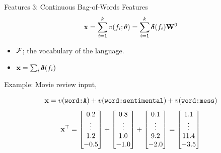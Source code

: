 \documentclass{beamer}
\begin{document}
\begin{frame}{Features 3: Continuous Bag-of-Words Features}
  \[ \mathbf{x} = \sum_{i=1}^{k} v(f_i; \theta) = \sum_{i=1}^{k} \boldsymbol{\delta}(f_i) \mathbf{W}^0\]

  \begin{itemize}
  \item $\mathcal{F}$; the vocabulary of the language.
  \item $\mathbf{x} = \sum_{i} \boldsymbol{\delta}(f_i)$ 
  \end{itemize}

  Example: Movie review input, 
  \begin{center}
    \[\mathbf{x} = v(\texttt{word:A}) + v(\texttt{word:sentimental}) + v(\texttt{word:mess})\]
    \[ \mathbf{x}^\top = \begin{bmatrix} 0.2 \\ \vdots \\ 1.2 \\ -0.5 \\ \end{bmatrix} + \begin{bmatrix} 0.8 \\ \vdots \\ 1.0\\ -1.0 \\ \end{bmatrix} +
     \begin{bmatrix} 0.1 \\ \vdots \\ 9.2 \\ -2.0 \\ \end{bmatrix} 
    =  \begin{bmatrix} 1.1 \\ \vdots \\ 11.4 \\ -3.5 \\ \end{bmatrix} 
     \]
  \end{center}
\end{frame}
\end{document}
